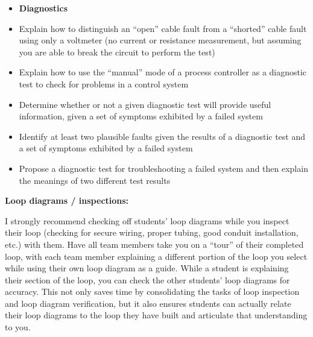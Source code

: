 \filbreak

\begin{itemize}
\item{} {\bf Diagnostics}
\item{} Explain how to distinguish an ``open'' cable fault from a ``shorted'' cable fault using only a voltmeter (no current or resistance measurement, but assuming you are able to break the circuit to perform the test)
\item{} Explain how to use the ``manual'' mode of a process controller as a diagnostic test to check for problems in a control system
\item{} Determine whether or not a given diagnostic test will provide useful information, given a set of symptoms exhibited by a failed system
\item{} Identify at least two plausible faults given the results of a diagnostic test and a set of symptoms exhibited by a failed system
\item{} Propose a diagnostic test for troubleshooting a failed system and then explain the meanings of two different test results
\end{itemize}














\noindent
{\bf Loop diagrams / inspections:}

I strongly recommend checking off students' loop diagrams while you inspect their loop (checking for secure wiring, proper tubing, good conduit installation, etc.) with them.  Have all team members take you on a ``tour'' of their completed loop, with each team member explaining a different portion of the loop you select while using their own loop diagram as a guide.  While a student is explaining their section of the loop, you can check the other students' loop diagrams for accuracy.  This not only saves time by consolidating the tasks of loop inspection and loop diagram verification, but it also ensures students can actually relate their loop diagrams to the loop they have built and articulate that understanding to you.

\vskip 10pt

\goodbreak

